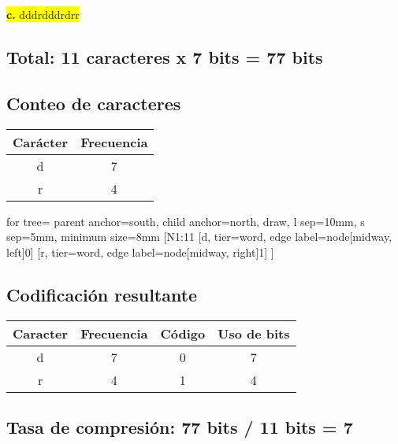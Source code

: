 \documentclass{article}
\begin{document}
	\vspace{0.5cm}
	\begin{center}
		\hspace{3cm}\colorbox{yellow}{{\textbf{c.} dddrdddrdrr}}\newline
		\subsection*{Total: 11 caracteres x 7 bits = 77 bits}
		\vspace{0.5cm}
		\subsection*{Conteo de caracteres}
		\begin{tabular}{c|c}
			\textbf{Carácter} & \textbf{Frecuencia} \\
			\hline
			d & 7 \\
			r & 4 \\
		\end{tabular}
		
		\vspace{1cm}
		
		\begin{forest}
			for tree={
				parent anchor=south,
				child anchor=north,
				draw,
				l sep=10mm,
				s sep=5mm,
				minimum size=8mm
			}
			[N1:11
				[d, tier=word, edge label={node[midway, left]{0}}]
				[r, tier=word, edge label={node[midway, right]{1}}]
			]
		\end{forest}
		
		
		\subsection*{Codificación resultante}
		\begin{tabular}{c|c|c|c}
			\textbf{Caracter} & \textbf{Frecuencia} & \textbf{Código} & \textbf{Uso de bits}\\
			\hline
			d & 7 & 0 & 7\\
			r & 4 & 1 & 4\\
		\end{tabular}
		\subsection*{Tasa de compresión: 77 bits / 11 bits = 7}	
	\end{center}
	
\end{document}
